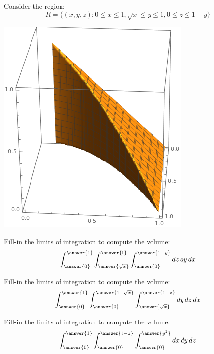 \documentclass{ximera}
\author{Bart Snapp}
\begin{document}
Consider the region:
\[
R = \{(x,y,z): 0\le x \le 1, \sqrt{x}\le y\le 1, 0 \le z \le 1-y\}
\]
\begin{image}[2in]
  \includegraphics{3DRectRegion.png}
\end{image}

\begin{problem}
  Fill-in the limits of integration to compute the volume:
  \[
  \int_{\answer{0}}^{\answer{1}}\int_{\answer{\sqrt{x}}}^{\answer{1}}\int_{\answer{0}}^{\answer{1-y}}\d z \d y \d x
  \]
\end{problem}



\begin{problem}
  Fill-in the limits of integration to compute the volume:
  \[
  \int_{\answer{0}}^{\answer{1}}\int_{\answer{0}}^{\answer{1-\sqrt{x}}}\int_{\answer{\sqrt{x}}}^{\answer{1-z}}\d y \d z \d x
  \]
\end{problem}

\begin{problem}
  Fill-in the limits of integration to compute the volume:
  \[
  \int_{\answer{0}}^{\answer{1}}\int_{\answer{0}}^{\answer{1-z}}\int_{\answer{0}}^{\answer{y^2}}\d x \d y \d z
  \]
\end{problem}
\end{document}
